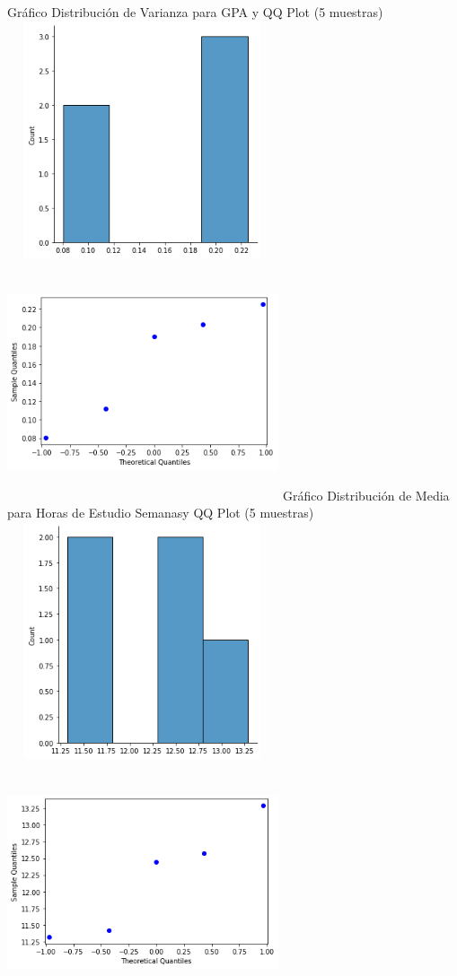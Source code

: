 \documentclass[12pt]{article}
\begin{document}
Gráfico Distribución de Varianza para GPA y QQ Plot (5 muestras)\\
\includegraphics[width=8cm, height=7cm]{gpa_histo2.5}
\includegraphics[width=8cm, height=7cm]{gpa_qq2.5}
\clearpage
Gráfico Distribución de Media para Horas de Estudio Semanasy QQ Plot (5 muestras)\\
\includegraphics[width=8cm, height=7cm]{horas_histo1.5}
\includegraphics[width=8cm, height=7cm]{horas_qq1.5}
\end{document}

